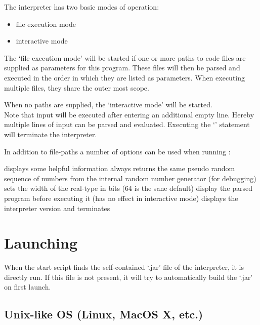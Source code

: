 The \setlX{} interpreter has two basic modes of operation:
\begin{itemize}
	\item file execution mode
	\item interactive mode
\end{itemize}

The `file execution mode' will be started if one or more paths to code files are supplied as parameters for this program. These files will then be parsed and executed in the order in which they are listed as parameters. When executing multiple files, they share the outer most scope.

When no paths are supplied, the `interactive mode' will be started.\\
Note that input will be executed after entering an additional empty line. Hereby multiple lines of input can be parsed and evaluated. Executing the `' statement will terminate the interpreter.


In addition to file-paths a number of options can be used when running \setlX{}:

\begin{itemize}
	      {displays some helpful information}
	      {always returns the same pseudo random sequence of numbers from the internal random number generator (for debugging)}
           {sets the width of the real-type in bits (64 is the sane default)}
           {display the parsed program before executing it (has no effect in interactive mode)}
           {displays the interpreter version and terminates}
\end{itemize}

\section{Launching}

When the start script finds the self-contained `.jar' file of the interpreter, it is directly run. If this file is not present, it will try to automatically build the `.jar' on first launch.

\subsection{Unix-like OS (Linux, MacOS X, etc.)}

